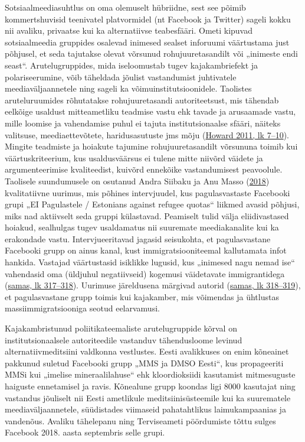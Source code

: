 \documentclass[estonian,]{article}
\begin{document}
Sotsiaalmeediasuhtlus on oma olemuselt hübriidne, sest see põimib kommertshuvisid teenivatel platvormidel (nt Facebook ja Twitter) sageli kokku nii avaliku, privaatse kui ka alternatiivse teabesfääri. Ometi kipuvad sotsiaalmeedia gruppides osalevad inimesed sealset inforuumi väärtustama just põhjusel, et seda tajutakse olevat võrsunud rohujuuretasandilt või „inimeste endi seast``. Arutelugruppides, mida iseloomustab tugev kajakambriefekt ja polariseerumine, võib täheldada jõulist vastandumist juhtivatele meediaväljaannetele ning sageli ka võimuinstitutsioonidele. Taolistes aruteluruumides rõhutatakse rohujuuretasandi autoriteetsust, mis tähendab eelkõige usaldust mitteametliku teadmise vastu ehk tavade ja arusaamade vastu, mille loomise ja vahendamise puhul ei tajuta institutsionaalse sfääri, näiteks valitsuse, meediaettevõtete, haridusasutuste jms mõju (\protect\hyperlink{Howard2011}{Howard 2011, lk 7--10}). Mingite teadmiste ja hoiakute tajumine rohujuuretasandilt võrsununa toimib kui väärtuskriteerium, kus usaldusväärsus ei tulene mitte niivõrd väidete ja argumenteerimise kvaliteedist, kuivõrd ennekõike vastandumisest peavoolule. Taolisele suundumusele on osutanud Andra Siibaku ja Anu Masso (\protect\hyperlink{Siibak2018}{2018}) kvalitatiivne uurimus, mis põhines intervjuudel, kus pagulasvastaste Facebooki grupi „EI Pagulastele / Estonians against refugee quotas`` liikmed avasid põhjusi, miks nad aktiivselt seda gruppi külastavad. Peamiselt tulid välja eliidivastased hoiakud, sealhulgas tugev usaldamatus nii suuremate meediakanalite kui ka erakondade vastu. Intervjueeritavad jagasid seisukohta, et pagulasvastane Facebooki grupp on ainus kanal, kust immigratsiooniteemal kallutamata infot hankida. Vastajad väärtustasid isiklikke lugusid, kus „inimesed nagu nemad ise`` vahendasid oma (üldjuhul negatiivseid) kogemusi väidetavate immigrantidega (\protect\hyperlink{Siibak2018}{samas, lk 317--318}). Uurimuse järeldusena märgivad autorid (\protect\hyperlink{Siibak2018}{samas, lk 318--319}), et pagulasvastane grupp toimis kui kajakamber, mis võimendas ja ühtlustas massiimmigratsiooniga seotud eelarvamusi.

\begin{casebox}
Kajakambristunud poliitikateemaliste arutelugruppide kõrval on
institutsionaalsele autoriteedile vastanduv tähendusloome levinud
alternatiivmeditsiini valdkonna vestlustes. Eesti avalikkuses on enim
kõneainet pakkunud suletud Facebooki grupp „MMS ja DMSO Eesti``, kus
propageeriti MMSi kui „imelise mineraalilahuse`` ehk kloordioksiidi
kasutamist mitmesuguste haiguste ennetamisel ja ravis. Kõnealune grupp
koondas ligi 8000 kasutajat ning vastandus jõuliselt nii Eesti
ametlikule meditsiinisüsteemile kui ka suurematele meediaväljaannetele,
süüdistades viimaseid pahatahtlikus laimukampaanias ja vandenõus.
Avaliku tähelepanu ning Terviseameti pöördumiste tõttu sulges Facebook
2018. aasta septembris selle grupi.
\end{casebox}
\end{document}
